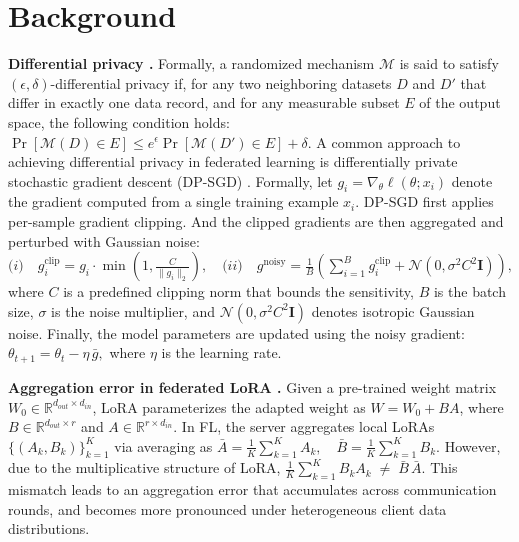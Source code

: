 \vspace{-3mm}

\section{Background} 
\label{sec:back}





\textbf{Differential privacy \cite{dwork2014dpfoundations}.}  Formally, a randomized mechanism $\mathcal{M}$ is said to satisfy
$(\epsilon,\delta)$-differential privacy
if, for any two neighboring datasets $D$ and $D'$
that differ in exactly one data record,
and for any measurable subset $E$ of the output space,
the following condition holds:
$
\Pr[\mathcal{M}(D) \in E]
\leq e^{\epsilon} \Pr[\mathcal{M}(D') \in E] + \delta.
$ A common approach to achieving differential privacy in federated learning
is differentially private stochastic gradient descent (DP-SGD) \cite{abadi2016deep}.
Formally, let $g_i = \nabla_\theta \ell(\theta; x_i)$ denote the gradient
computed from a single training example $x_i$.
DP-SGD first applies per-sample gradient clipping. And the clipped gradients are then aggregated and perturbed with Gaussian noise:
$
\textit{(i)}\quad
g_i^{\mathrm{clip}} = g_i \cdot \min\!\left(1, \frac{C}{\|g_i\|_2}\right), \quad
\textit{(ii)}\quad
g^{\mathrm{noisy}} = \frac{1}{B}\left(\sum_{i=1}^{B} g_i^{\mathrm{clip}} + \mathcal{N}\!\left(0, \sigma^2 C^2 \mathbf{I}\right)\right),
$
where $C$ is a predefined clipping norm that bounds the sensitivity, $B$ is the batch size, $\sigma$ is the noise multiplier, and $\mathcal{N}(0, \sigma^2 C^2 \mathbf{I})$ denotes isotropic Gaussian noise.
Finally, the model parameters are updated using the noisy gradient:
$
\theta_{t+1} = \theta_t - \eta \, \bar{g},
$
where $\eta$ is the learning rate.
















\textbf{Aggregation error in federated LoRA \cite{wang2024flora}.} Given a pre-trained weight matrix $W_0 \in \mathbb{R}^{d_{out} \times d_{in}}$,
LoRA parameterizes the adapted weight as $W = W_0 + BA$, where $B \in \mathbb{R}^{d_{out} \times r}$ and $A \in \mathbb{R}^{r \times d_{in}}$.
In FL, the server aggregates local LoRAs $\{(A_k, B_k)\}_{k=1}^K$ via averaging as
$
\bar{A} = \frac{1}{K}\sum_{k=1}^K A_k, \quad
\bar{B} = \frac{1}{K}\sum_{k=1}^K B_k.
$
However, due to the multiplicative structure of LoRA,
$
\frac{1}{K}\sum_{k=1}^K B_k A_k \;\neq\; \bar{B}\,\bar{A}.
$
This mismatch leads to an aggregation error that accumulates across communication rounds,
and becomes more pronounced under heterogeneous client data distributions.


